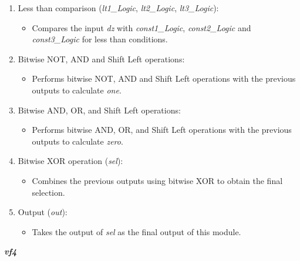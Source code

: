 \begin{enumerate}

\item Less than comparison (\textit{lt1\_Logic}, \textit{lt2\_Logic}, \textit{lt3\_Logic}):
\begin{itemize}
\item Compares the input \textit{dz} with \textit{const1\_Logic}, \textit{const2\_Logic} and \textit{const3\_Logic} for less than conditions.
\end{itemize}

\item Bitwise NOT, AND and Shift Left operations:
\begin{itemize}
\item Performs bitwise NOT, AND and Shift Left operations with the previous outputs to calculate \textit{one}.
\end{itemize}

\item Bitwise AND, OR, and Shift Left operations:
\begin{itemize}
\item Performs bitwise AND, OR, and Shift Left operations with the previous outputs to calculate \textit{zero}.
\end{itemize}

\item Bitwise XOR operation (\textit{sel}):
\begin{itemize}
\item Combines the previous outputs using bitwise XOR to obtain the final selection.
\end{itemize}

\item Output (\textit{out}):
\begin{itemize}
\item Takes the output of \textit{sel} as the final output of this module.
\end{itemize}

\end{enumerate}

\vspace{0.5cm}

\textbf{\textit{vf4}}

